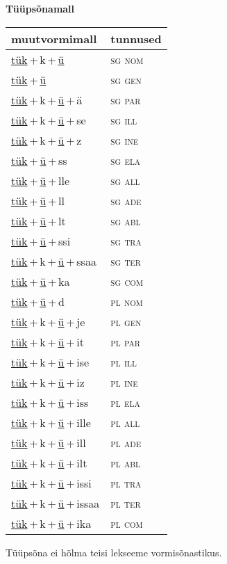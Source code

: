 
\vspace{1.8em}
\begin{minipage}{\textwidth}
\textbf{Tüüpsõnamall \,}\\

\begin{sideways}
\begin{tabular}{l l}
muutvormimall & tunnused \\
\hline
\underline{tük}\,+\,k\,+\,\underline{ü} & \textsc{ sg nom } \\
\underline{tük}\,+\,\underline{ü} & \textsc{ sg gen } \\
\underline{tük}\,+\,k\,+\,\underline{ü}\,+\,ä & \textsc{ sg par } \\
\underline{tük}\,+\,k\,+\,\underline{ü}\,+\,se & \textsc{ sg ill } \\
\underline{tük}\,+\,k\,+\,\underline{ü}\,+\,z & \textsc{ sg ine } \\
\underline{tük}\,+\,\underline{ü}\,+\,ss & \textsc{ sg ela } \\
\underline{tük}\,+\,\underline{ü}\,+\,lle & \textsc{ sg all } \\
\underline{tük}\,+\,\underline{ü}\,+\,ll & \textsc{ sg ade } \\
\underline{tük}\,+\,\underline{ü}\,+\,lt & \textsc{ sg abl } \\
\underline{tük}\,+\,\underline{ü}\,+\,ssi & \textsc{ sg tra } \\
\underline{tük}\,+\,k\,+\,\underline{ü}\,+\,ssaa & \textsc{ sg ter } \\
\underline{tük}\,+\,\underline{ü}\,+\,ka & \textsc{ sg com } \\
\underline{tük}\,+\,\underline{ü}\,+\,d & \textsc{ pl nom } \\
\underline{tük}\,+\,k\,+\,\underline{ü}\,+\,je & \textsc{ pl gen } \\
\underline{tük}\,+\,k\,+\,\underline{ü}\,+\,it & \textsc{ pl par } \\
\underline{tük}\,+\,k\,+\,\underline{ü}\,+\,ise & \textsc{ pl ill } \\
\underline{tük}\,+\,k\,+\,\underline{ü}\,+\,iz & \textsc{ pl ine } \\
\underline{tük}\,+\,k\,+\,\underline{ü}\,+\,iss & \textsc{ pl ela } \\
\underline{tük}\,+\,k\,+\,\underline{ü}\,+\,ille & \textsc{ pl all } \\
\underline{tük}\,+\,k\,+\,\underline{ü}\,+\,ill & \textsc{ pl ade } \\
\underline{tük}\,+\,k\,+\,\underline{ü}\,+\,ilt & \textsc{ pl abl } \\
\underline{tük}\,+\,k\,+\,\underline{ü}\,+\,issi & \textsc{ pl tra } \\
\underline{tük}\,+\,k\,+\,\underline{ü}\,+\,issaa & \textsc{ pl ter } \\
\underline{tük}\,+\,k\,+\,\underline{ü}\,+\,ika & \textsc{ pl com } \\
\end{tabular}
\end{sideways}
\label{tab:tüüpsõnamall-tükkü}

\end{minipage}

 
\vspace{1em}
\noindent Tüüpsõna ei hõlma teisi lekseeme vormi\-sõnastikus.
